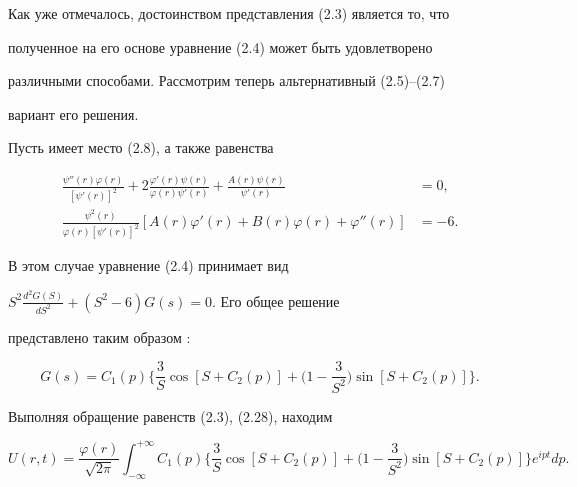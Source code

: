 


Как уже отмечалось, достоинством представления (2.3) является то, что 


полученное на его основе уравнение (2.4) может быть удовлетворено 


различными способами. Рассмотрим теперь альтернативный (2.5)--(2.7)


вариант его решения. 


 


\begin{case} 


Пусть имеет место (2.8), а также равенства 


\begin{align} 


\frac{\psi''(r)\varphi(r)}{[\psi'(r)]^2}+ 


2\frac{\varphi'(r)\psi(r)}{\varphi(r)\psi'(r)}+ 


\frac{A(r)\psi(r)}{\psi'(r)}&=0, \\ 


\frac{\psi^2(r)}{\varphi(r)[\psi'(r)]^2}[A(r)\varphi'(r)+ 


B(r)\varphi(r)+\varphi''(r)]&=-6. 


\end{align} 


В этом случае уравнение (2.4) принимает вид 


$S^2\frac{d^2G(S)}{dS^2}+(S^2-6)G(s)=0$. Его общее решение 


представлено таким образом \cite{1}: 


\begin{equation} 


G(s)=C_1(p)\biggl\{\frac{3}{S}\cos[S+C_2(p)]+ 


\biggl(1-\frac{3}{S^2} \biggr)\sin[S+C_2(p)]\biggr\}. 


\end{equation} 


Выполняя обращение равенств (2.3), (2.28), находим 


\begin{equation} 


U(r,t)=\frac{\varphi(r)}{\sqrt{2\pi}}\int^{+\infty}_{-\infty} 


C_1(p)\biggl\{\frac{3}{S}\cos[S+C_2(p)]+ 


\biggl(1-\frac{3}{S^2} \biggr)\sin[S+C_2(p)]\biggr\} 


e^{ipt}dp. 


\end{equation} 



\end{case}
